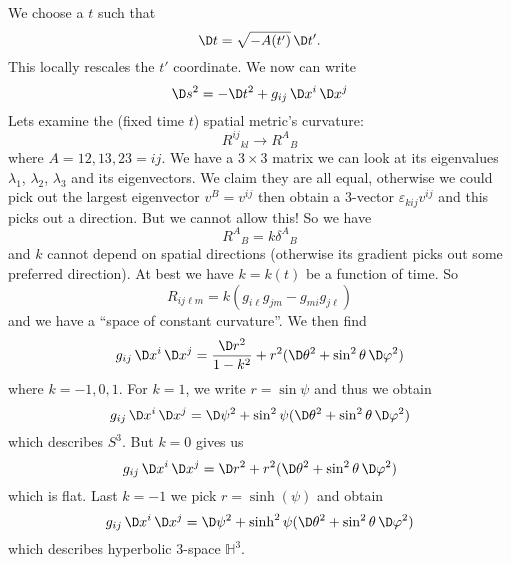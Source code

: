 We choose a $t$ such that
\begin{equation}
\D t=\sqrt{-A(t')}\,\D t'.
\end{equation}
This locally rescales the $t'$ coordinate. We now can write
\begin{equation}
\D s^{2}=-\D t^{2}+g_{ij}\,\D x^{i}\,\D x^{j}
\end{equation}
Lets examine the (fixed time $t$) spatial metric's curvature:
\begin{equation}
{R^{ij}}_{kl}\to {R^{A}}_{B}
\end{equation}
where $A=12,13,23=ij$. We have a $3\times3$ matrix we can look at
its eigenvalues $\lambda_1$, $\lambda_2$, $\lambda_3$ and its
eigenvectors. We claim they are all equal, otherwise we could
pick out the largest eigenvector $v^{B}=v^{ij}$ then obtain a
3-vector $\varepsilon_{kij}v^{ij}$ and this picks out a
direction. But we cannot allow this! So we have
\begin{equation}
{R^{A}}_{B} = k{\delta^{A}}_{B}
\end{equation}
and $k$ cannot depend on spatial directions (otherwise its
gradient picks out some preferred direction). At best we have
$k=k(t)$ be a function of time. So
\begin{equation}
R_{ij\ell m}=k(g_{i\ell}g_{jm}-g_{mi}g_{j\ell})
\end{equation}
and we have a ``space of constant curvature''. We then find
\begin{equation}
g_{ij}\,\D x^{i}\,\D x^{j}=\frac{\D
  r^{2}}{1-k^{2}}+r^{2}(\D\theta^{2}+\sin^{2}\theta\,\D\varphi^{2})
\end{equation}
where $k=-1,0,1$. For $k=1$, we write $r=\sin\psi$ and thus we
obtain
\begin{equation}
g_{ij}\,\D x^{i}\,\D x^{j}=\D\psi^{2}+\sin^{2}\psi(\D\theta^{2}+\sin^{2}\theta\,\D\varphi^{2})
\end{equation}
which describes $S^{3}$. But $k=0$ gives us
\begin{equation}
g_{ij}\,\D x^{i}\,\D x^{j}=\D r^{2}+r^{2}(\D\theta^{2}+\sin^{2}\theta\,\D\varphi^{2})
\end{equation}
which is flat. Last $k=-1$ we pick $r=\sinh(\psi)$ and obtain
\begin{equation}
g_{ij}\,\D x^{i}\,\D x^{j}=\D\psi^{2}+\sinh^{2}\psi(\D\theta^{2}+\sin^{2}\theta\,\D\varphi^{2})
\end{equation}
which describes hyperbolic 3-space $\mathbb{H}^{3}$.

